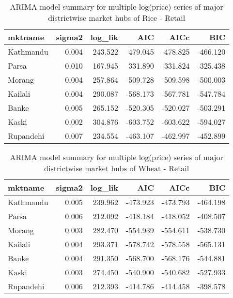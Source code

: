 \documentclass[12pt,]{article}
\begin{document}
\begin{table}

\caption{\label{tab:multiple-arima-summary}ARIMA model summary for multiple log(price) series of major districtwise market hubs of Rice - Retail}
\centering
\begin{tabular}[t]{lrrrrr}
\toprule
mktname & sigma2 & log\_lik & AIC & AICc & BIC\\
\midrule
Kathmandu & 0.004 & 243.522 & -479.045 & -478.825 & -466.120\\
Parsa & 0.010 & 167.945 & -331.890 & -331.824 & -325.438\\
Morang & 0.004 & 257.864 & -509.728 & -509.598 & -500.003\\
Kailali & 0.004 & 290.087 & -568.173 & -567.781 & -547.784\\
Banke & 0.005 & 265.152 & -520.305 & -520.027 & -503.291\\
\addlinespace
Kaski & 0.002 & 304.876 & -603.752 & -603.622 & -594.027\\
Rupandehi & 0.007 & 234.554 & -463.107 & -462.997 & -452.899\\
\bottomrule
\end{tabular}
\end{table}
\begin{table}

\caption{\label{tab:multiple-arima-summary}ARIMA model summary for multiple log(price) series of major districtwise market hubs of Wheat - Retail}
\centering
\begin{tabular}[t]{lrrrrr}
\toprule
mktname & sigma2 & log\_lik & AIC & AICc & BIC\\
\midrule
Kathmandu & 0.005 & 239.962 & -473.923 & -473.793 & -464.198\\
Parsa & 0.006 & 212.092 & -418.184 & -418.052 & -408.507\\
Morang & 0.003 & 282.470 & -554.939 & -554.611 & -538.730\\
Kailali & 0.004 & 293.371 & -578.742 & -578.558 & -565.131\\
Banke & 0.004 & 291.350 & -568.700 & -568.176 & -544.881\\
\addlinespace
Kaski & 0.003 & 274.450 & -540.900 & -540.682 & -527.933\\
Rupandehi & 0.006 & 212.393 & -414.786 & -414.458 & -398.578\\
\bottomrule
\end{tabular}
\end{table}
\end{document}
